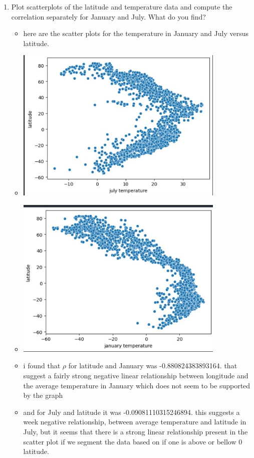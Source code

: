 \documentclass[12pt,twoside]{article}
\begin{document}
\begin{enumerate}
\begin{enumerate}
	\item Plot scatterplots of the latitude and temperature data and compute the correlation separately for January and July. What do you find?
 \begin{itemize}
    \item here are the scatter plots for the temperature in January and July versus latitude.
     \item \includegraphics[width=10cm]{homework/homework_1/scatter_1.jpg}
    \item \includegraphics[width=10cm]{homework/homework_1/scatter_2.jpg}
    \item i found that $\rho$ for latitude and January was -0.880824383893164. that suggest a fairly strong negative linear relationship between longitude and the average temperature in January which does not seem to be supported by the graph 
    \item and for July and latitude it was  -0.09081110315246894. this suggests a week negative relationship, between average temperature and latitude in July, but it seems that there is a strong linear relationship present in the scatter plot if we segment the data based on if one is above or bellow 0 latitude. 
    

\end{itemize}
\end{enumerate}
\end{enumerate}
\end{document}
